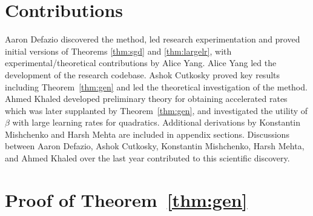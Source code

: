 \documentclass{article}
\begin{document}
\section{Contributions}
Aaron Defazio discovered the method, led research experimentation and proved initial versions of Theorems \ref{thm:sgd} and \ref{thm:largelr}, with experimental/theoretical contributions by Alice Yang. Alice Yang led the development of the research codebase. 
Ashok Cutkosky proved key results including Theorem~\ref{thm:gen} and led the theoretical investigation of the method. Ahmed Khaled developed preliminary theory for obtaining accelerated rates which was later supplanted by Theorem~\ref{thm:gen}, and investigated the utility of $\beta$ with large learning rates for quadratics.
Additional derivations by Konstantin Mishchenko and Harsh Mehta are included in appendix sections. 
Discussions between Aaron Defazio, Ashok Cutkosky, Konstantin Mishchenko, Harsh Mehta, and Ahmed Khaled over the last year contributed to this scientific discovery.




















\newpage
\appendix

\section{Proof of Theorem~\ref{thm:gen}}\label{app:proofgen}
\end{document}
